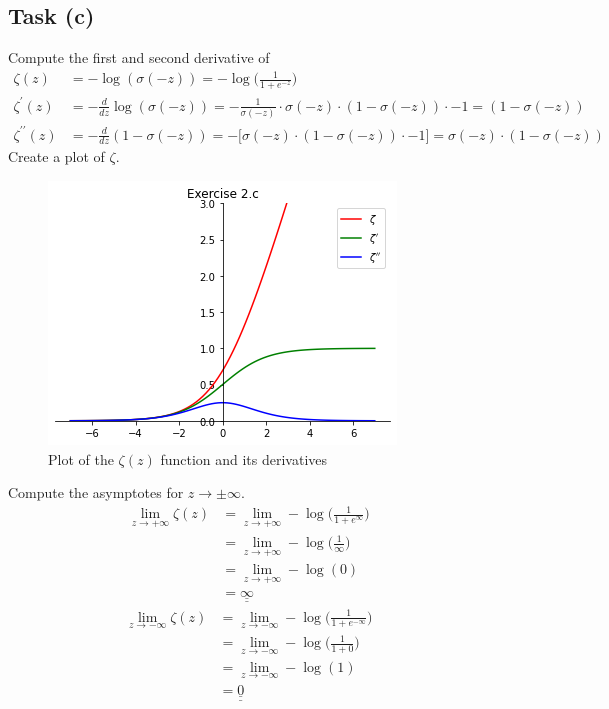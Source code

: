 \documentclass[onecolumn]{article}
\def\doubleunderline#1{\underline{\underline{#1}}}
\begin{document}
\subsection{Task (c)}
Compute the first and second derivative of
\begin{align*}
	\zeta(z) &= -\log(\sigma(-z)) = -\log\Bigg(\frac{1}{1+e^{-z}}\Bigg) \\
	\zeta^{\prime}(z) &= - \frac{d}{dz} \log (\sigma(-z)) = - \frac{1}{\sigma(-z)} \cdot \sigma(-z) \cdot (1 - \sigma(-z)) \cdot -1 = (1 - \sigma(-z)) \\
	\zeta^{\prime\prime}(z) &= - \frac{d}{dz} (1 - \sigma(-z)) = - \Big[\sigma(-z) \cdot (1 - \sigma(-z)) \cdot -1 \Big] = \sigma(-z) \cdot (1 - \sigma(-z))
\end{align*}
Create a plot of $\zeta$.
\begin{figure}[tbh]
	\centering
	\includegraphics[width=.5\linewidth]{fig/exercise_2c.png}
	\caption{Plot of the $\zeta(z)$ function and its derivatives}
\end{figure}

Compute the asymptotes for $z \rightarrow \pm \infty$.
\begin{align*}
	\lim_{z \rightarrow + \infty} \zeta(z) &= \lim_{z \rightarrow + \infty} - \log \Big(\frac{1}{1+e^{\infty}}\Big) && \\
	&= \lim_{z \rightarrow + \infty} - \log \Big(\frac{1}{\infty}\Big) && \\
	&= \lim_{z \rightarrow + \infty} - \log(0) && \\
	&= \doubleunderline{\infty}
\end{align*}
\begin{align*}
	\lim_{z \rightarrow - \infty} \zeta(z) &= \lim_{z \rightarrow - \infty} - \log \Big(\frac{1}{1+e^{-\infty}}\Big) && \\
	&= \lim_{z \rightarrow - \infty} - \log \Big(\frac{1}{1+0}\Big) && \\
	&= \lim_{z \rightarrow - \infty} - \log(1) && \\
	&= \doubleunderline{0}
\end{align*}
\end{document}
